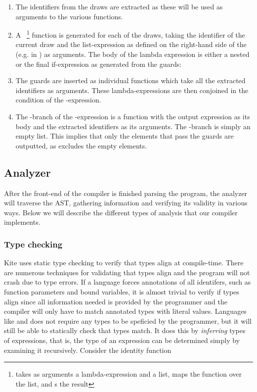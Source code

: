 \begin{enumerate}
\item The identifiers from the draws are extracted as these will be used as arguments to the various functions.

\item A ~\footnote{ takes as arguments a lambda-expression and a list, maps the function over the list, and s the result} function is generated for each of the draws, taking the identifier of the current draw and the list-expression as defined on the right-hand side of the \code{<-} (e.g. \code{[1, 2, 3]} in ) as arguments. The body of the lambda expression is either a nested  or the final if-expression as generated from the guards:

\item The guards are inserted as individual functions which take all the extracted identifiers as arguments. These lambda-expressions are then conjoined in the condition of the -expression.

\item The -branch of the -expression is a function with the output expression as its body and the extracted identifiers as its arguments. The -branch is simply an empty list. This implies that only the elements that pass the guards are outputted, as  excludes the empty elements.
\end{enumerate}


\subsection{Analyzer}
After the front-end of the compiler is finished parsing the program, the analyzer will traverse the AST, gathering information and verifying its validity in various ways. Below we will describe the different types of analysis that our compiler implements.

\subsubsection{Type checking}
Kite uses static type checking to verify that types align at compile-time. There are numerous techniques for validating that types align and the program will not crash due to type errors. If a language forces annotations of all identifers, such as function parameters and bound variables, it is almost trivial to verify if types align since all information needed is provided by the programmer and the compiler will only have to match annotated types with literal values. Languages like  and  does not require any types to be speficied by the programmer, but it will still be able to statically check that types match. It does this by \emph{inferring} types of expressions, that is, the type of an expression can be determined simply by examining it recursively. Consider the identity function 

